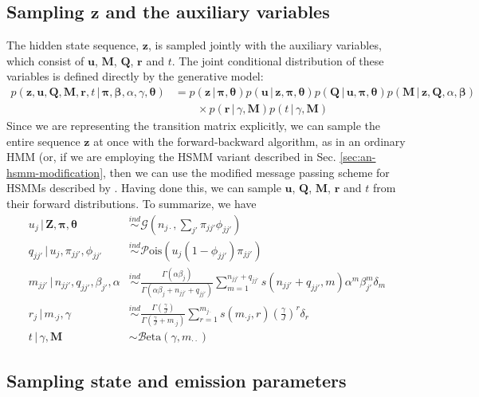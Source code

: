 \documentclass[12pt,letterpaper]{report}
\newcommand{\Pois}[1]{\mathcal{P}\mathrm{ois}(#1)}
\newcommand{\Gamm}[2]{\mathcal{G}(#1,#2)}
\newcommand{\Beta}[2]{\mathcal{B}\mathrm{eta}(#1,#2)}
\newcommand{\given}{\, \vert \,}
\newcommand{\bM}{\mathbf{M}}
\newcommand{\bQ}{\mathbf{Q}}
\newcommand{\bz}{\mathbf{z}}
\newcommand{\bZ}{\mathbf{Z}}
\newcommand{\bu}{\mathbf{u}}
\newcommand{\br}{\mathbf{r}}
\newcommand{\bbeta}{\boldsymbol{\beta}}
\newcommand{\btheta}{\boldsymbol{\theta}}
\newcommand{\bpi}{\boldsymbol{\pi}}
\begin{document}
\subsection{Sampling $\bz$ and the auxiliary variables}
\label{sec:sampling-z_t}

The hidden state sequence, $\bz$, is sampled jointly with the auxiliary
variables, which consist of $\bu$, $\bM$, $\bQ$, $\br$ and $t$.  The
joint conditional distribution of these variables is defined directly
by the generative model:
\begin{align}
  \label{eq:19}
  p(\bz, \bu, \bQ, \bM, \br, t \given \bpi, \bbeta, \alpha, \gamma,
  \btheta) &= p(\bz \given \bpi, \btheta) p(\bu \given \bz, \bpi, \btheta) p(\bQ \given
  \bu, \bpi, \btheta) p(\bM \given
  \bz, \bQ, \alpha, \bbeta) \\
  &\qquad \times p(\br \given
  \gamma, \bM) p(t \given \gamma, \bM)
\end{align}
Since we are representing the transition matrix explicitly, we can
sample the entire sequence $\bz$ at once with the forward-backward algorithm,
as in an ordinary HMM (or, if we are employing the HSMM variant
described in Sec. \ref{sec:an-hsmm-modification}, then we can use the
modified message passing scheme for HSMMs described by
\citet{johnson2013bayesian}.  
Having done this, we can sample $\bu$, $\bQ$, $\bM$,
$\br$ and $t$ from their forward distributions.  To summarize,
we have
\begin{align}
  \label{eq:48}
  u_j \given \bZ, \bpi, \btheta &\stackrel{ind}{\sim}
  \Gamm{n_{j\cdot}}{\sum_{j'} \pi_{jj'}\phi_{jj'}} \\
  q_{jj'} \given u_j, \pi_{jj'}, \phi_{jj'} &\stackrel{ind}{\sim}
  \Pois{u_j(1 - \phi_{jj'})\pi_{jj'}} \\
  m_{jj'} \given n_{jj'}, q_{jj'}, \beta_{j'}, \alpha &\stackrel{ind}{\sim}
  \frac{\Gamma(\alpha\beta_j)}{\Gamma(\alpha\beta_j + n_{jj'} +
    q_{jj'})}\sum_{m=1}^{n_{jj'} + q_{jj'}} s(n_{jj'} + q_{jj'}, m) \alpha^m \beta_{j'}^m \delta_{m}
  \\
  r_j \given m_{\cdot j}, \gamma &\stackrel{ind}{\sim}
  \frac{\Gamma(\frac{\gamma}{J})}{\Gamma(\frac{\gamma}{J} + m_{\cdot
      j})} \sum_{r=1}^{m_{j\cdot}} s(m_{\cdot j}, r)
  \left(\frac{\gamma}{J}\right)^r \delta_r \\
  t \given \gamma, \bM &\sim \Beta{\gamma}{m_{\cdot\cdot}}
\end{align}

\subsection{Sampling state and emission parameters}
\label{sec:sampling-eta}
\end{document}
